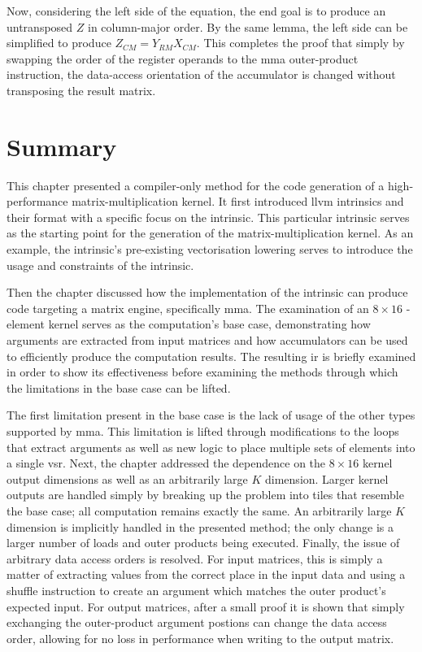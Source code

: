 \documentclass[\main/thesis.tex]{subfiles}
\begin{document}
Now, considering the left side of the equation, the end goal is to produce an untransposed $Z$ in column-major order.
By the same lemma, the left side can be simplified to produce $Z_{CM} = Y_{RM}X_{CM}$.
This completes the proof that simply by swapping the order of the register operands to the \gls{mma} outer-product instruction, the data-access orientation of the accumulator is changed without transposing the result matrix.

\section{Summary}
This chapter presented a compiler-only method for the code generation of a high-performance matrix-multiplication kernel.
It first introduced \gls{llvm} intrinsics and their format with a specific focus on the  intrinsic.
This particular intrinsic serves as the starting point for the generation of the matrix-multiplication kernel.
As an example, the intrinsic's pre-existing vectorisation lowering serves to introduce the usage and constraints of the intrinsic.

Then the chapter discussed how the implementation of the intrinsic can produce code targeting a \gls{matrix engine}, specifically \gls{mma}.
The examination of an $8 \times 16$ -element kernel serves as the computation's base case, demonstrating how arguments are extracted from input matrices and how accumulators can be used to efficiently produce the computation results.
The resulting \gls{ir} is briefly examined in order to show its effectiveness before examining the methods through which the limitations in the base case can be lifted.

The first limitation present in the base case is the lack of usage of the other types supported by \gls{mma}.
This limitation is lifted through modifications to the loops that extract arguments as well as new logic to place multiple sets of elements into a single \gls{vsr}.
Next, the chapter addressed the dependence on the $8 \times 16$ kernel output dimensions as well as an arbitrarily large $K$ dimension.
Larger kernel outputs are handled simply by breaking up the problem into tiles that resemble the base case; all computation remains exactly the same.
An arbitrarily large $K$ dimension is implicitly handled in the presented method; the only change is a larger number of loads and outer products being executed.
Finally, the issue of arbitrary data access orders is resolved.
For input matrices, this is simply a matter of extracting values from the correct place in the input data and using a shuffle instruction to create an argument which matches the outer product's expected input.
For output matrices, after a small proof it is shown that simply exchanging the outer-product argument postions can change the data access order, allowing for no loss in performance when writing to the output matrix.
\end{document}
